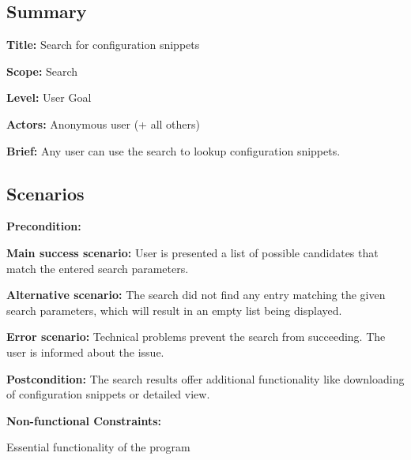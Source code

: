 \subsection*{Summary}


\begin{DoxyItemize}
\item {\bfseries Title\+:} Search for configuration snippets
\item {\bfseries Scope\+:} Search
\item {\bfseries Level\+:} User Goal
\item {\bfseries Actors\+:} Anonymous user (+ all others)
\item {\bfseries Brief\+:} Any user can use the search to lookup configuration snippets.
\end{DoxyItemize}

\subsection*{Scenarios}


\begin{DoxyItemize}
\item {\bfseries Precondition\+:}
\item {\bfseries Main success scenario\+:} User is presented a list of possible candidates that match the entered search parameters.
\item {\bfseries Alternative scenario\+:} The search did not find any entry matching the given search parameters, which will result in an empty list being displayed.
\item {\bfseries Error scenario\+:} Technical problems prevent the search from succeeding. The user is informed about the issue.
\item {\bfseries Postcondition\+:} The search results offer additional functionality like downloading of configuration snippets or detailed view.
\item {\bfseries Non-\/functional Constraints\+:}
\begin{DoxyItemize}
\item Essential functionality of the program 
\end{DoxyItemize}
\end{DoxyItemize}